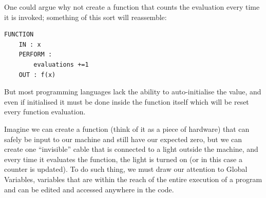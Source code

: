 



One could argue why not create a function that counts the evaluation every time it is invoked; something of this sort will reassemble: 
\begin{lstlisting}
FUNCTION 
    IN : x
    PERFORM : 
        evaluations +=1
    OUT : f(x)
\end{lstlisting}

But most programming languages lack the ability to auto-initialise the value, and even if initialised it must be done inside the function itself which will be reset every function evaluation.

Imagine we can create a function (think of it as a piece of hardware) that can safely be input to our machine and still have our expected zero, but we  can create one ``invisible'' cable that is connected to a light outside the machine, and every time it evaluates the function, the light is turned on (or in this case a counter is updated). To do such thing, we must draw our attention to Global Variables, variables that are within the reach of the entire execution of a program and can be edited and accessed anywhere in the code. 

